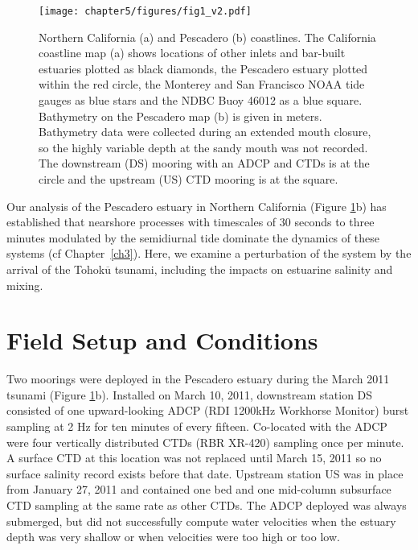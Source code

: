 \begin{figure}
\centering
\texttt{[image: chapter5/figures/fig1\_v2.pdf]}\protect\caption{Northern California (a) and Pescadero (b) coastlines. The California
coastline map (a) shows locations of other inlets and bar-built estuaries
plotted as black diamonds, the Pescadero estuary plotted within the
red circle, the Monterey and San Francisco NOAA tide gauges as blue
stars and the NDBC Buoy 46012 as a blue square. Bathymetry on the
Pescadero map (b) is given in meters. Bathymetry data were collected
during an extended mouth closure, so the highly variable depth at
the sandy mouth was not recorded. The downstream (DS) mooring with
an ADCP and CTDs is at the circle and the upstream (US) CTD mooring
is at the square. \label{fig:coastline_map_with_inlets}}
\end{figure}

Our analysis of the Pescadero estuary in Northern California (Figure
\ref{fig:coastline_map_with_inlets}b) has established that nearshore
processes with timescales of 30 seconds to three minutes modulated
by the semidiurnal tide dominate the dynamics of these systems (cf Chapter~\ref{ch3}).
Here, we examine a perturbation of the system by the arrival of the
Tohok$\overline{\mathrm{u}}$ tsunami, including the impacts on estuarine salinity and mixing. 


\section{Field Setup and Conditions}

Two moorings were deployed in the Pescadero estuary during the March
2011 tsunami (Figure \ref{fig:coastline_map_with_inlets}b). Installed
on March 10, 2011, downstream station DS consisted of one upward-looking
ADCP (RDI 1200kHz Workhorse Monitor) burst sampling at 2 Hz for ten
minutes of every fifteen. Co-located with the ADCP were four vertically
distributed CTDs (RBR XR-420) sampling once per minute. A surface
CTD at this location was not replaced until March 15, 2011 so no surface
salinity record exists before that date. Upstream station US was in
place from January 27, 2011 and contained one bed and one mid-column
subsurface CTD sampling at the same rate as other CTDs. The ADCP deployed
was always submerged, but did not successfully compute water velocities
when the estuary depth was very shallow or when velocities were too
high or too low. 


